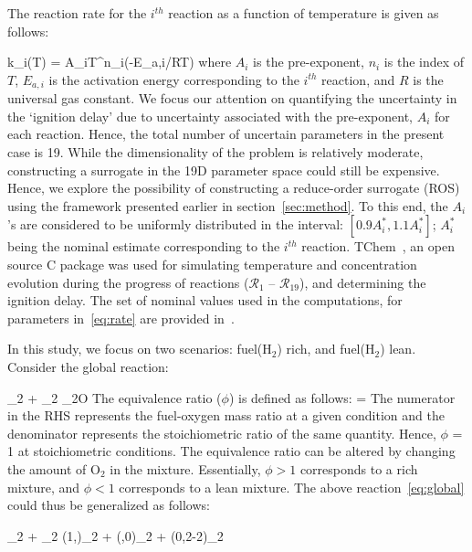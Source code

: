 The reaction rate for the $i^{th}$ reaction as a function of temperature
is given as follows:

\be
k_i(T) = A_iT^{n_i}\exp(-E_{a,i}/RT) 
\label{eq:rate}
\ee
%
where $A_i$ is the pre-exponent, $n_i$ is the index of $T$, $E_{a,i}$
is the activation energy corresponding to the $i^{th}$ reaction, and
$R$ is the universal gas constant. We focus our attention on 
quantifying the uncertainty in the `ignition delay' due to uncertainty
associated with the pre-exponent, $A_i$ for each reaction. Hence, the
total number of uncertain parameters in the present case is 19. 
While the dimensionality of the problem is relatively moderate,
constructing a surrogate in the 19D parameter space could still be
expensive. Hence, we explore the possibility of constructing a
reduce-order surrogate (ROS) using the framework presented earlier
in section~\ref{sec:method}. To this end, the $A_i$'s are considered
to be uniformly distributed in the interval: $[0.9A_i^\ast, 1.1A_i^\ast]$;
$A_i^\ast$ being the nominal estimate corresponding to the $i^{th}$
reaction. TChem~\cite{Safta:2011}, an open source C package was used
for simulating temperature and concentration evolution during the
progress of reactions ($\mathcal{R}_1$ -- $\mathcal{R}_{19}$), and determining
the ignition delay. The set of nominal values used in the computations,
for parameters in~\eqref{eq:rate} are provided in~\cite{Yetter:1991}. 

In this study, we focus on two scenarios: fuel(H$_2$) rich, and fuel(H$_2$)
lean. Consider the global reaction:

_2 + _2 _2O
\label{eq:global}
\ee 
%
The equivalence ratio ($\phi$) is defined as follows:
%
\be
\phi = 
\ee
%
The numerator in the RHS represents the fuel-oxygen mass ratio at a given condition
and the denominator represents the stoichiometric ratio of the same quantity. Hence,
$\phi$ = 1 at stoichiometric conditions. The equivalence ratio can be altered
by changing the amount of O$_2$ in the mixture. Essentially, $\phi>1$ corresponds to
a rich mixture, and $\phi<1$ corresponds to a lean mixture. The above
reaction~\eqref{eq:global} could thus be generalized as follows:

_2 + \alpha{}_2 \min(1,\alpha)_2 + 
\max(,0)_2 + \max(0,2-2\alpha)_2
\label{eq:gen}
\ee 






